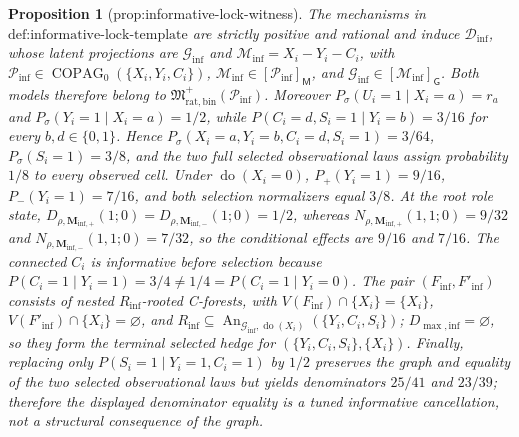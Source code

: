 \documentclass{article}
\newtheorem{proposition}{Proposition}
\begin{document}
\begin{proposition}[prop:informative-lock-witness]\label{prop:informative-lock-witness}
The mechanisms in \(\text{def:informative-lock-template}\) are strictly positive and rational and induce \(\mathcal D_{\mathrm{inf}}\), whose latent projections are \(\mathcal G_{\mathrm{inf}}\) and \(\mathcal M_{\mathrm{inf}}=X_i-Y_i-C_i\), with \(\mathcal P_{\mathrm{inf}}\in\operatorname{COPAG}_0(\{X_i,Y_i,C_i\})\), \(\mathcal M_{\mathrm{inf}}\in[\mathcal P_{\mathrm{inf}}]_{\mathsf M}\), and \(\mathcal G_{\mathrm{inf}}\in[\mathcal M_{\mathrm{inf}}]_{\mathsf G}\). Both models therefore belong to \(\mathfrak M_{\mathrm{rat,bin}}^+(\mathcal P_{\mathrm{inf}})\). Moreover \(P_{\sigma}(U_i=1\mid X_i=a)=r_a\) and \(P_{\sigma}(Y_i=1\mid X_i=a)=1/2\), while \(P(C_i=d,S_i=1\mid Y_i=b)=3/16\) for every \(b,d\in\{0,1\}\). Hence \(P_{\sigma}(X_i=a,Y_i=b,C_i=d,S_i=1)=3/64\), \(P_{\sigma}(S_i=1)=3/8\), and the two full selected observational laws assign probability \(1/8\) to every observed cell. Under \(\operatorname{do}(X_i=0)\), \(P_+(Y_i=1)=9/16\), \(P_-(Y_i=1)=7/16\), and both selection normalizers equal \(3/8\). At the root role state, \(D_{\rho,\mathbf M_{\mathrm{inf},+}}(1;0)=D_{\rho,\mathbf M_{\mathrm{inf},-}}(1;0)=1/2\), whereas \(N_{\rho,\mathbf M_{\mathrm{inf},+}}(1,1;0)=9/32\) and \(N_{\rho,\mathbf M_{\mathrm{inf},-}}(1,1;0)=7/32\), so the conditional effects are \(9/16\) and \(7/16\). The connected \(C_i\) is informative before selection because \(P(C_i=1\mid Y_i=1)=3/4\neq1/4=P(C_i=1\mid Y_i=0)\). The pair \((F_{\mathrm{inf}},F'_{\mathrm{inf}})\) consists of nested \(R_{\mathrm{inf}}\)-rooted C-forests, with \(V(F_{\mathrm{inf}})\cap\{X_i\}=\{X_i\}\), \(V(F'_{\mathrm{inf}})\cap\{X_i\}=\varnothing\), and \(R_{\mathrm{inf}}\subseteq\operatorname{An}_{\mathcal G_{\mathrm{inf}},\operatorname{do}(X_i)}(\{Y_i,C_i,S_i\})\); \(D_{\max,\mathrm{inf}}=\varnothing\), so they form the terminal selected hedge for \((\{Y_i,C_i,S_i\},\{X_i\})\). Finally, replacing only \(P(S_i=1\mid Y_i=1,C_i=1)\) by \(1/2\) preserves the graph and equality of the two selected observational laws but yields denominators \(25/41\) and \(23/39\); therefore the displayed denominator equality is a tuned informative cancellation, not a structural consequence of the graph.
\end{proposition}
\end{document}

